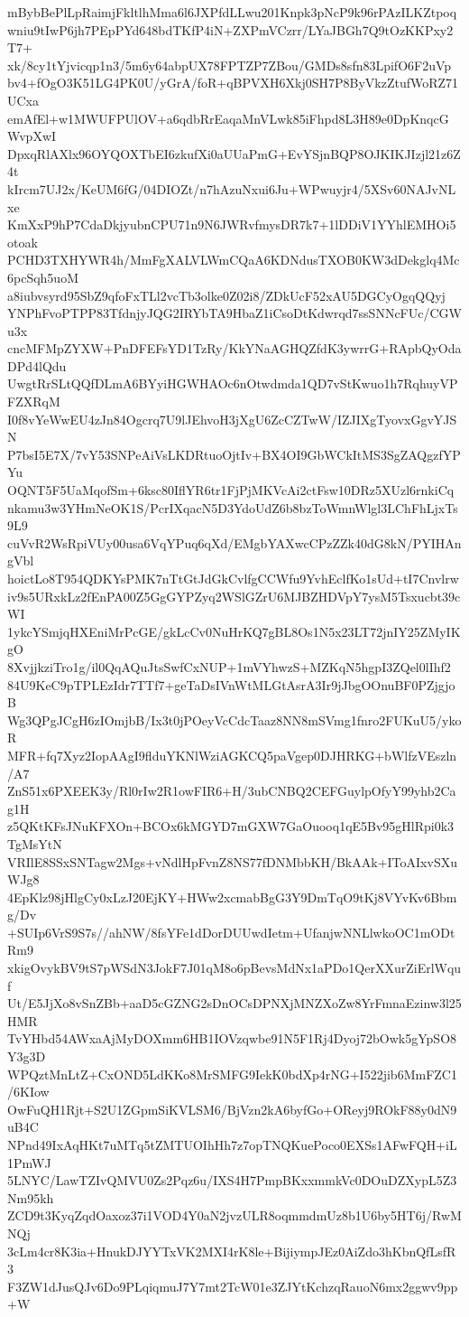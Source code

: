 mBybBePlLpRaimjFkltlhMma6l6JXPfdLLwu201Knpk3pNcP9k96rPAzILKZtpoq
wniu9tIwP6jh7PEpPYd648bdTKfP4iN+ZXPmVCzrr/LYaJBGh7Q9tOzKKPxy2T7+
xk/8cy1tYjvicqp1n3/5m6y64abpUX78FPTZP7ZBou/GMDs8sfn83LpifO6F2uVp
bv4+fOgO3K51LG4PK0U/yGrA/foR+qBPVXH6Xkj0SH7P8ByVkzZtufWoRZ71UCxa
emAfEl+w1MWUFPUlOV+a6qdbRrEaqaMnVLwk85iFhpd8L3H89e0DpKnqcGWvpXwI
DpxqRlAXlx96OYQOXTbEI6zkufXi0aUUaPmG+EvYSjnBQP8OJKIKJIzjl21z6Z4t
kIrcm7UJ2x/KeUM6fG/04DIOZt/n7hAzuNxui6Ju+WPwuyjr4/5XSv60NAJvNLxe
KmXxP9hP7CdaDkjyubnCPU71n9N6JWRvfmysDR7k7+1lDDiV1YYhlEMHOi5otoak
PCHD3TXHYWR4h/MmFgXALVLWmCQaA6KDNdusTXOB0KW3dDekglq4Mc6pcSqh5uoM
a8iubvsyrd95SbZ9qfoFxTLl2vcTb3olke0Z02i8/ZDkUcF52xAU5DGCyOgqQQyj
YNPhFvoPTPP83TfdnjyJQG2IRYbTA9HbaZ1iCsoDtKdwrqd7ssSNNcFUc/CGWu3x
cncMFMpZYXW+PnDFEFsYD1TzRy/KkYNaAGHQZfdK3ywrrG+RApbQyOdaDPd4lQdu
UwgtRrSLtQQfDLmA6BYyiHGWHAOc6nOtwdmda1QD7vStKwuo1h7RqhuyVPFZXRqM
I0f8vYeWwEU4zJn84Ogcrq7U9lJEhvoH3jXgU6ZcCZTwW/IZJIXgTyovxGgvYJSN
P7bsI5E7X/7vY53SNPeAiVsLKDRtuoOjtIv+BX4OI9GbWCkItMS3SgZAQgzfYPYu
OQNT5F5UaMqofSm+6ksc80IflYR6tr1FjPjMKVcAi2ctFsw10DRz5XUzl6rnkiCq
nkamu3w3YHmNeOK1S/PcrIXqacN5D3YdoUdZ6b8bzToWmnWlgl3LChFhLjxTs9L9
cuVvR2WsRpiVUy00usa6VqYPuq6qXd/EMgbYAXwcCPzZZk40dG8kN/PYIHAngVbl
hoictLo8T954QDKYsPMK7nTtGtJdGkCvlfgCCWfu9YvhEclfKo1sUd+tI7Cnvlrw
iv9s5URxkLz2fEnPA00Z5GgGYPZyq2WSlGZrU6MJBZHDVpY7ysM5Tsxucbt39cWI
1ykcYSmjqHXEniMrPcGE/gkLcCv0NuHrKQ7gBL8Os1N5x23LT72jnIY25ZMyIKgO
8XvjjkziTro1g/il0QqAQuJtsSwfCxNUP+1mVYhwzS+MZKqN5hgpI3ZQel0lIhf2
84U9KeC9pTPLEzIdr7TTf7+geTaDsIVnWtMLGtAsrA3Ir9jJbgOOnuBF0PZjgjoB
Wg3QPgJCgH6zIOmjbB/Ix3t0jPOeyVcCdcTaaz8NN8mSVmg1fnro2FUKuU5/ykoR
MFR+fq7Xyz2IopAAgI9flduYKNlWziAGKCQ5paVgep0DJHRKG+bWlfzVEszln/A7
ZnS51x6PXEEK3y/Rl0rIw2R1owFIR6+H/3ubCNBQ2CEFGuylpOfyY99yhb2Cag1H
z5QKtKFsJNuKFXOn+BCOx6kMGYD7mGXW7GaOuooq1qE5Bv95gHlRpi0k3TgMsYtN
VRIlE8SSxSNTagw2Mgs+vNdlHpFvnZ8NS77fDNMbbKH/BkAAk+IToAIxvSXuWJg8
4EpKlz98jHlgCy0xLzJ20EjKY+HWw2xcmabBgG3Y9DmTqO9tKj8VYvKv6Bbmg/Dv
+SUIp6VrS9S7s//ahNW/8fsYFe1dDorDUUwdIetm+UfanjwNNLlwkoOC1mODtRm9
xkigOvykBV9tS7pWSdN3JokF7J01qM8o6pBevsMdNx1aPDo1QerXXurZiErlWquf
Ut/E5JjXo8vSnZBb+aaD5cGZNG2sDnOCsDPNXjMNZXoZw8YrFmnaEzinw3l25HMR
TvYHbd54AWxaAjMyDOXmm6HB1IOVzqwbe91N5F1Rj4Dyoj72bOwk5gYpSO8Y3g3D
WPQztMnLtZ+CxOND5LdKKo8MrSMFG9IekK0bdXp4rNG+I522jib6MmFZC1/6KIow
OwFuQH1Rjt+S2U1ZGpmSiKVLSM6/BjVzn2kA6byfGo+OReyj9ROkF88y0dN9uB4C
NPnd49IxAqHKt7uMTq5tZMTUOIhHh7z7opTNQKuePoco0EXSs1AFwFQH+iL1PmWJ
5LNYC/LawTZIvQMVU0Zs2Pqz6u/IXS4H7PmpBKxxmmkVc0DOuDZXypL5Z3Nm95kh
ZCD9t3KyqZqdOaxoz37i1VOD4Y0aN2jvzULR8oqmmdmUz8b1U6by5HT6j/RwMNQj
3cLm4cr8K3ia+HnukDJYYTxVK2MXI4rK8le+BijiympJEz0AiZdo3hKbnQfLsfR3
F3ZW1dJusQJv6Do9PLqiqmuJ7Y7mt2TcW01e3ZJYtKchzqRauoN6mx2ggwv9pp+W
